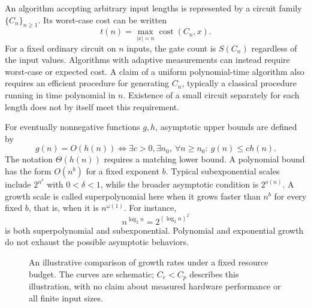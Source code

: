 \documentclass[11pt,oneside,openany]{book}
\theoremstyle{definition}
\begin{document}
An algorithm accepting arbitrary input lengths is represented by a circuit family $\{C_n\}_{n\ge1}$. Its worst-case cost can be written
\begin{equation}
 t(n)=\max_{|x|=n}\operatorname{cost}(C_n,x).
\end{equation}
For a fixed ordinary circuit on $n$ inputs, the gate count is $S(C_n)$ regardless of the input values. Algorithms with adaptive measurements can instead require worst-case or expected cost. A claim of a uniform polynomial-time algorithm also requires an efficient procedure for generating $C_n$, typically a classical procedure running in time polynomial in $n$. Existence of a small circuit separately for each length does not by itself meet this requirement.

For eventually nonnegative functions $g,h$, asymptotic upper bounds are defined by
\begin{equation}
 g(n)=O(h(n))\iff
 \exists c>0,\exists n_0,\ \forall n\ge n_0:\ g(n)\le ch(n).
\end{equation}
The notation $\Theta(h(n))$ requires a matching lower bound. A polynomial bound has the form $O(n^b)$ for a fixed exponent $b$. Typical subexponential scales include $2^{n^\delta}$ with $0<\delta<1$, while the broader asymptotic condition is $2^{o(n)}$. A growth scale is called superpolynomial here when it grows faster than $n^b$ for every fixed $b$, that is, when it is $n^{\omega(1)}$. For instance,
\begin{equation}
 n^{\log_2n}=2^{(\log_2n)^2}
\end{equation}
is both superpolynomial and subexponential. Polynomial and exponential growth do not exhaust the possible asymptotic behaviors.
\par
\begin{figure}[htbp]
\centering
{}
\caption{An illustrative comparison of growth rates under a fixed resource budget. The curves are schematic; $C_e<C_p$ describes this illustration, with no claim about measured hardware performance or all finite input sizes.}
\end{figure}
\par
\end{document}
